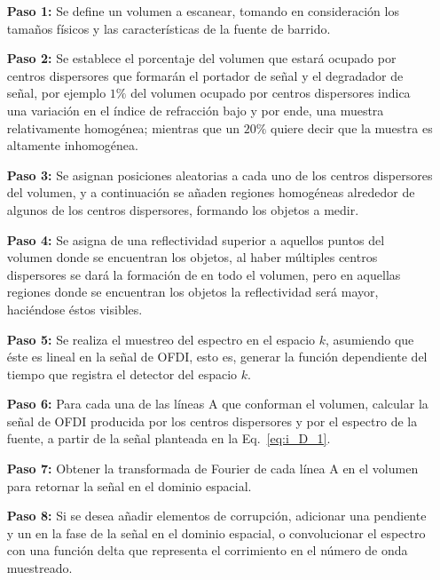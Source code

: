 \begin{itemize}
\item[\textbf{Paso 1:}] Se define un volumen a escanear, tomando en consideración los tamaños físicos y las características de la fuente de barrido.
\item[\textbf{Paso 2:}] Se establece el porcentaje del volumen que estará ocupado por centros dispersores que formarán el \speckle portador de señal y el \speckle degradador de señal, por ejemplo $1\%$ del volumen ocupado por centros dispersores indica una variación en el índice de refracción bajo y por ende, una muestra relativamente homogénea; mientras que un $20\%$ quiere decir que la muestra es altamente inhomogénea.
\item[\textbf{Paso 3:}] Se asignan posiciones aleatorias a cada uno de los centros dispersores del volumen, y a continuación se añaden regiones homogéneas alrededor de algunos de los centros dispersores, formando los objetos a medir.
\item[\textbf{Paso 4:}] Se asigna de una reflectividad superior a aquellos puntos del volumen donde se encuentran los objetos, al haber múltiples centros dispersores se dará la formación de \speckle en todo el volumen, pero en aquellas regiones donde se encuentran los objetos la reflectividad será mayor, haciéndose éstos visibles.
\item[\textbf{Paso 5:}] Se realiza el muestreo del espectro en el espacio $k$, asumiendo que éste es lineal en la señal de OFDI, esto es, generar la función dependiente del tiempo que registra el detector del espacio $k$.
\item[\textbf{Paso 6:}] Para cada una de las líneas A que conforman el volumen, calcular la señal de OFDI producida por los centros dispersores y por el espectro de la fuente, a partir de la señal planteada en la Eq.~\ref{eq:i_D_1}.
\item[\textbf{Paso 7:}] Obtener la transformada de Fourier de cada línea A en el volumen para retornar la señal en el dominio espacial.
\item[\textbf{Paso 8:}] Si se desea añadir elementos de corrupción, adicionar una pendiente y un \offset en la fase de la señal en el dominio espacial, o convolucionar el espectro con una función delta que representa el corrimiento en el número de onda muestreado.
\end{itemize}


